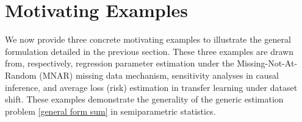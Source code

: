 \documentclass{article}
\theoremstyle{plain}
\theoremstyle{definition}
\theoremstyle{remark}
\begin{document}
\section{Motivating Examples}
\label{sec:examples}

We now provide three concrete motivating examples to illustrate the general formulation detailed in the previous section. These three examples are drawn from, respectively, regression parameter estimation under the Missing-Not-At-Random (MNAR) missing data mechanism, sensitivity analyses in causal inference, and average loss (risk) estimation in transfer learning under dataset shift. These examples demonstrate the generality of the generic estimation problem \eqref{general form sum} in semiparametric statistics.


\end{document}
